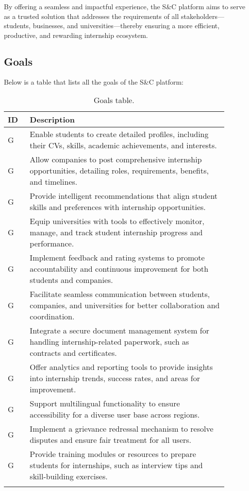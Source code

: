 By offering a seamless and impactful experience, the S\&C platform aims to serve as a trusted solution that addresses the requirements of all stakeholders—students, businesses, and universities—thereby ensuring a more efficient, productive, and rewarding internship ecosystem.


\subsection{Goals}
\label{subsec:goals}%
\setcounter{g}{1}
\newcommand{\cg}{\theg\stepcounter{g}}

Below is a table that lists all the goals of the S\&C platform:

\begin{center}
    \begin{longtable}{ |l|p{0.9\linewidth}| }
        \hline
        \textbf{ID} & \textbf{Description} \\
        \hline
        G\cg & Enable students to create detailed profiles, including their CVs, skills, academic achievements, and interests. \\
        \hline
        G\cg & Allow companies to post comprehensive internship opportunities, detailing roles, requirements, benefits, and timelines. \\
        \hline
        G\cg & Provide intelligent recommendations that align student skills and preferences with internship opportunities. \\
        \hline
        G\cg & Equip universities with tools to effectively monitor, manage, and track student internship progress and performance. \\
        \hline
        G\cg & Implement feedback and rating systems to promote accountability and continuous improvement for both students and companies. \\
        \hline
        G\cg & Facilitate seamless communication between students, companies, and universities for better collaboration and coordination. \\
        \hline
        G\cg & Integrate a secure document management system for handling internship-related paperwork, such as contracts and certificates. \\
        \hline
        G\cg & Offer analytics and reporting tools to provide insights into internship trends, success rates, and areas for improvement. \\
        \hline
        G\cg & Support multilingual functionality to ensure accessibility for a diverse user base across regions. \\
        \hline
        G\cg & Implement a grievance redressal mechanism to resolve disputes and ensure fair treatment for all users. \\
        \hline
        G\cg & Provide training modules or resources to prepare students for internships, such as interview tips and skill-building exercises. \\
        \hline
        \caption{Goals table.}
        \label{tab:goals_tab}%
    \end{longtable}
\end{center}

